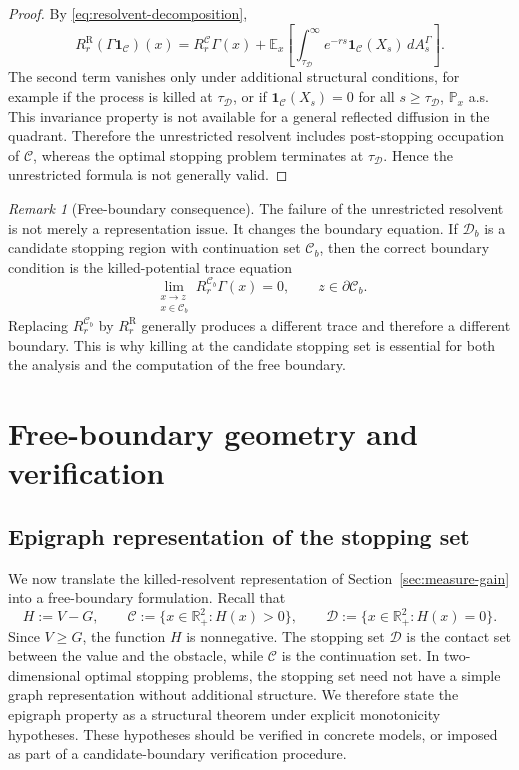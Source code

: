 \documentclass[pdflatex,sn-mathphys-num]{sn-jnl}
\theoremstyle{plain}
\theoremstyle{definition}
\theoremstyle{remark}
\newtheorem{remark}[theorem]{Remark}
\numberwithin{equation}{section}
\begin{document}
\begin{proof} 
By \eqref{eq:resolvent-decomposition}, 
\[ R_r^{\mathrm R}(\Gamma\mathbf 1_{\mathcal C})(x) = R_r^{\mathcal C}\Gamma(x) + \mathbb E_x \left[ \int_{\tau_{\mathcal D}}^\infty e^{-rs}\mathbf 1_{\mathcal C}(X_s)\,dA_s^\Gamma \right]. \] 
The second term vanishes only under additional structural conditions, for example if the process is killed at \(\tau_{\mathcal D}\), or if 
$\mathbf 1_{\mathcal C}(X_s)=0$ for all $s\ge\tau_{\mathcal D}$, $\mathbb P_x$ a.s. 
This invariance property is not available for a general reflected diffusion in the quadrant. Therefore the unrestricted resolvent includes post-stopping occupation of \(\mathcal C\), whereas the optimal stopping problem terminates at \(\tau_{\mathcal D}\). Hence the unrestricted formula is not generally valid. 
\end{proof} 

\begin{remark}[Free-boundary consequence] \label{rem:free-boundary-consequence} 
The failure of the unrestricted resolvent is not merely a representation issue. It changes the boundary equation. If \(\mathcal D_b\) is a candidate stopping region with continuation set \(\mathcal C_b\), then the correct boundary condition is the killed-potential trace equation 
\[
\lim_{\substack{x\to z\\ x\in\mathcal C_b}} R_r^{\mathcal C_b}\Gamma(x)=0, \qquad z\in\partial\mathcal C_b . 
\]
Replacing \(R_r^{\mathcal C_b}\) by \(R_r^{\mathrm R}\) generally produces a different trace and therefore a different boundary. This is why killing at the candidate stopping set is essential for both the analysis and the computation of the free boundary. 
\end{remark}  

\section{Free-boundary geometry and verification} \label{sec:free-boundary}  

\subsection{Epigraph representation of the stopping set} \label{subsec:epigraph-representation} 

We now translate the killed-resolvent representation of Section~\ref{sec:measure-gain} into a free-boundary formulation. Recall that 
\[ 
H:=V-G,\qquad \mathcal C:=\{x\in\mathbb R_+^2:H(x)>0\}, \qquad \mathcal D:=\{x\in\mathbb R_+^2:H(x)=0\}. 
\] 
Since \(V\ge G\), the function \(H\) is nonnegative. The stopping set \(\mathcal D\) is the contact set between the value and the obstacle, while \(\mathcal C\) is the continuation set. In two-dimensional optimal stopping problems, the stopping set need not have a simple graph representation without additional structure. We therefore state the epigraph property as a structural theorem under explicit monotonicity hypotheses. These hypotheses should be verified in concrete models, or imposed as part of a candidate-boundary verification procedure. 
\end{document}
